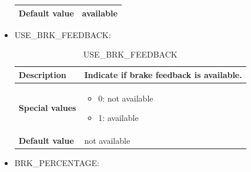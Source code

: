 \begin{itemize}
\begin{longtable}{|l|l|}
					\begin{minipage}[t]{0.22\linewidth} \textbf{Default value}	\end{minipage}
				&	\begin{minipage}[t]{0.78\linewidth} available \end{minipage} \\

				\hline

			\end{longtable}

		\item USE\_BRK\_FEEDBACK:

			\begin{longtable}{|l|l|}
				\caption{USE\_BRK\_FEEDBACK}\\
				\hline

					\begin{minipage}[t]{0.22\linewidth} \textbf{Description}	\end{minipage}
				&	\begin{minipage}[t]{0.78\linewidth} Indicate if brake feedback is available. \end{minipage} \\

				\hline

					\begin{minipage}[t]{0.22\linewidth} \textbf{Special values}	\end{minipage}
				&	\begin{minipage}[t]{0.78\linewidth} \begin{itemize} \item 0: not available \item 1: available \end{itemize} \end{minipage} \\

				\hline

					\begin{minipage}[t]{0.22\linewidth} \textbf{Default value}	\end{minipage}
				&	\begin{minipage}[t]{0.78\linewidth} not available \end{minipage} \\

				\hline

			\end{longtable}

		\item BRK\_PERCENTAGE:


\end{itemize}
